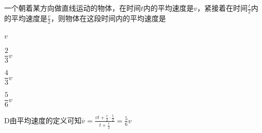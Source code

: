 一个朝着某方向做直线运动的物体，在时间\(t\)内的平均速度是\(v\)，紧接着在时间\(\frac{t}{2}\)内的平均速度是\(\frac{v}{2}\)，则物体在这段时间内的平均速度是\paren[D]
\begin{choices}
	\item \(v\)
	\item \(\dfrac{2}{3}v\)
	\item \(\dfrac{4}{3}v\)
	\item \(\dfrac{5}{6}v\)
\end{choices}
\begin{answer}
	D\qquad \kaishu 由平均速度的定义可知\(\overline{v} = \frac{vt + \frac{v}{2}\cdot\frac{t}{2}}{t + \frac{t}{2}} = \frac{5}{6}v\)
\end{answer}